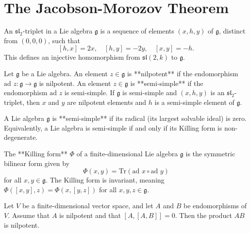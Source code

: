 
\chapter{The Jacobson-Morozov Theorem}

\begin{definition}
    \label{def:sl2_triplet}
    An $\mathfrak{sl}_2$-triplet in a Lie algebra $\mathfrak{g}$ is a sequence of elements $(x, h, y)$ of $\mathfrak{g}$, distinct from $(0, 0, 0)$, such that
    $$[h, x] = 2x, \quad [h, y] = -2y, \quad [x, y] = -h.$$
    This defines an injective homomorphism from $\mathfrak{sl}(2, k)$ to $\mathfrak{g}$.
\end{definition}

\begin{definition}
    \label{def:nilpotent_and_semi_simple_elements}
    Let $\mathfrak{g}$ be a Lie algebra. An element $z \in \mathfrak{g}$ is **nilpotent** if the endomorphism $\text{ad } z: \mathfrak{g} \to \mathfrak{g}$ is nilpotent. An element $z \in \mathfrak{g}$ is **semi-simple** if the endomorphism $\text{ad } z$ is semi-simple. If $\mathfrak{g}$ is semi-simple and $(x, h, y)$ is an $\mathfrak{sl}_2$-triplet, then $x$ and $y$ are nilpotent elements and $h$ is a semi-simple element of $\mathfrak{g}$.
\end{definition}

\begin{definition}
    \label{def:semi_simple_lie_algebra}
    A Lie algebra $\mathfrak{g}$ is **semi-simple** if its radical (its largest solvable ideal) is zero. Equivalently, a Lie algebra is semi-simple if and only if its Killing form is non-degenerate.
\end{definition}

\begin{definition}
    \label{def:killing_form}
    The **Killing form** $\Phi$ of a finite-dimensional Lie algebra $\mathfrak{g}$ is the symmetric bilinear form given by
    $$\Phi(x, y) = \text{Tr}(\text{ad } x \circ \text{ad } y)$$
    for all $x, y \in \mathfrak{g}$. The Killing form is invariant, meaning $\Phi([x, y], z) = \Phi(x, [y, z])$ for all $x, y, z \in \mathfrak{g}$.
\end{definition}

\begin{lemma}
    \label{lem:nilpotency_of_product}
    Let $V$ be a finite-dimensional vector space, and let $A$ and $B$ be endomorphisms of $V$. Assume that $A$ is nilpotent and that $[A, [A, B]] = 0$. Then the product $AB$ is nilpotent.
\end{lemma}

